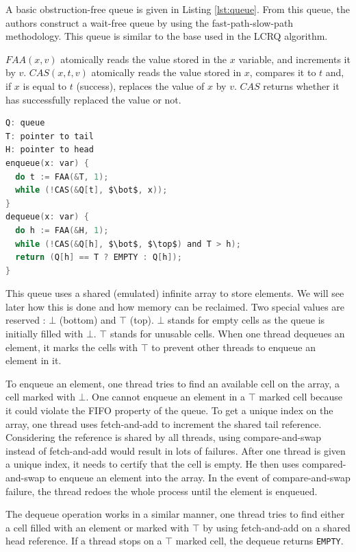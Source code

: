 A basic obstruction-free queue is given in Listing \ref{lst:queue}. From this
queue, the authors construct a wait-free queue by using the fast-path-slow-path
methodology. This queue is similar to the base used in the LCRQ algorithm.

$FAA(x, v)$ atomically reads the value stored in the $x$ variable, and
increments it by $v$. $CAS(x, t, v)$ atomically reads the value stored in $x$,
compares it to $t$ and, if $x$ is equal to $t$ (success), replaces the value of
$x$ by $v$. $CAS$ returns whether it has successfully replaced the value or not.

\begin{lstlisting}[mathescape,
                   frame=single,
                   caption={An obstruction-free queue using an infinite array.},
                   label={lst:queue},
                   language=C]
Q: queue
T: pointer to tail
H: pointer to head
enqueue(x: var) {
  do t := FAA(&T, 1);
  while (!CAS(&Q[t], $\bot$, x));
}
dequeue(x: var) {
  do h := FAA(&H, 1);
  while (!CAS(&Q[h], $\bot$, $\top$) and T > h);
  return (Q[h] == T ? EMPTY : Q[h]);
}
\end{lstlisting}

 This queue uses a shared (emulated) infinite array to
store elements. We will see later how this is done and how memory can be
reclaimed. Two special values are reserved : $\bot$ (bottom) and $\top$ (top).
$\bot$ stands for empty cells as the queue is initially filled with $\bot$.
$\top$ stands for unusable cells. When one thread dequeues an element, it marks
the cells with $\top$ to prevent other threads to enqueue an element in it.

To enqueue an element, one thread tries to find an available cell on the array,
a cell marked with $\bot$. One cannot enqueue an element in a $\top$ marked cell
because it could violate the FIFO property of the queue. To get a unique index
on the array, one thread uses fetch-and-add to increment the shared tail
reference. Considering the reference is shared by all threads, using
compare-and-swap instead of fetch-and-add would result in lots of failures.
After one thread is given a unique index, it needs to certify that the cell is
empty. He then uses compared-and-swap to enqueue an element into the array. In
the event of compare-and-swap failure, the thread redoes the whole process until
the element is enqueued.

The dequeue operation works in a similar manner, one thread tries to find either a
cell filled with an element or marked with $\top$ by using fetch-and-add on a
shared head reference. If a thread stops on a $\top$ marked cell, the dequeue
returns \texttt{EMPTY}.

